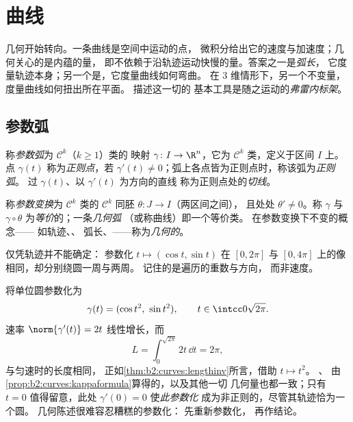 \chapter{曲线}\label{ch:b2:curves}

几何开始转向。一条曲线是空间中运动的点，
微积分给出它的速度与加速度；几何关心的是内蕴的量，
即不依赖于沿轨迹运动快慢的量。答案之一是\emph{弧长}，
它度量轨迹本身；另一个是\emph{}，它度量曲线如何弯曲。
在 $3$ 维情形下，另一个不变量\emph{}，
度量曲线如何扭出所在平面。
描述这一切的
基本工具是随之运动的\emph{弗雷内标架}。

\section{参数弧}

\begin{definition}[参数弧]\label{def:b2:curves:arc}
称\emph{参数弧}为
$\mathcal{C}^k$（$k \geq 1$）类的
映射 $\gamma \colon I \to \R^n$，它为
$\mathcal{C}^k$ 类，定义于区间 $I$ 上。点 $\gamma(t)$ 称为\emph{正则点}，若
$\gamma'(t) \neq 0$；弧上各点皆为正则点时，称该弧为\emph{正则弧}。
过 $\gamma(t)$、以 $\gamma'(t)$ 为方向的直线
称为正则点处的\emph{切线}。
\end{definition}

\begin{definition}[参数变换]\label{def:b2:curves:reparam}
称\emph{参数变换}为
$\mathcal{C}^k$ 类的
$\mathcal{C}^k$ 同胚 $\theta \colon J \to I$（两区间之间），
且处处 $\theta' \neq 0$。称 $\gamma$ 与
$\gamma \circ \theta$ 为\emph{等价}的；一条\emph{几何弧}
（或称曲线）即一个等价类。
在参数变换下不变的概念——
如轨迹、、
弧长、——称为\emph{几何的}。
\end{definition}

\begin{remark}
仅凭轨迹并不能确定：
参数化 $t \mapsto (\cos t, \sin t)$ 在 $[0, 2\pi]$ 与
$[0, 4\pi]$ 上的像相同，却分别绕圆一周与两周。
记住的是遍历的重数与方向，
而非速度。
\end{remark}

\begin{example}\label{ex:b2:curves:speedinvariance}
将单位圆参数化为
\[
\gamma(t) = (\cos t^2,\ \sin t^2),
\qquad t \in \intcc0{\sqrt{2\pi}} .
\]
速率 $\norm{\gamma'(t)} = 2t$ 线性增长，而
\[
L = \int_0^{\sqrt{2\pi}}2t\,\dd t = 2\pi ,
\]
与匀速时的长度相同，
正如\cref{thm:b2:curves:lengthinv}所言，借助 $t \mapsto t^2$。
、
由\cref{prop:b2:curves:kappaformula}算得的，以及其他一切
几何量也都一致；只有 $t = 0$
值得留意，此处 $\gamma'(0) = 0$ 使\emph{此参数化}
成为非正则的，尽管其轨迹恰为一个圆。
几何陈述很难容忍糟糕的参数化：
先重新参数化，
再作结论。
\end{example}

